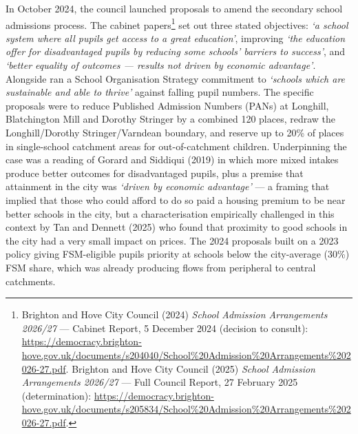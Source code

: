 \documentclass[
  12pt,
  titlepage]{article}
\begin{document}
In October 2024, the council launched proposals to amend the secondary
school admissions process. The cabinet papers\footnote{Brighton and Hove
  City Council (2024) \emph{School Admission Arrangements 2026/27} ---
  Cabinet Report, 5 December 2024 (decision to consult):
  \url{https://democracy.brighton-hove.gov.uk/documents/s204040/School\%20Admission\%20Arrangements\%202026-27.pdf}.
  Brighton and Hove City Council (2025) \emph{School Admission
  Arrangements 2026/27} --- Full Council Report, 27 February 2025
  (determination):
  \url{https://democracy.brighton-hove.gov.uk/documents/s205834/School\%20Admission\%20Arrangements\%202026-27.pdf}.}
set out three stated objectives: \emph{`a school system where all pupils
get access to a great education'}, improving \emph{`the education offer
for disadvantaged pupils by reducing some schools' barriers to
success'}, and \emph{`better equality of outcomes --- results not driven
by economic advantage'}. Alongside ran a School Organisation Strategy
commitment to \emph{`schools which are sustainable and able to thrive'}
against falling pupil numbers. The specific proposals were to reduce
Published Admission Numbers (PANs) at Longhill, Blatchington Mill and
Dorothy Stringer by a combined 120 places, redraw the Longhill/Dorothy
Stringer/Varndean boundary, and reserve up to 20\% of places in
single-school catchment areas for out-of-catchment children.
Underpinning the case was a reading of Gorard and Siddiqui (2019) in
which more mixed intakes produce better outcomes for disadvantaged
pupils, plus a premise that attainment in the city was \emph{`driven by
economic advantage'} --- a framing that implied that those who could
afford to do so paid a housing premium to be near better schools in the
city, but a characterisation empirically challenged in this context by
Tan and Dennett (2025) who found that proximity to good schools in the
city had a very small impact on prices. The 2024 proposals built on a
2023 policy giving FSM-eligible pupils priority at schools below the
city-average (30\%) FSM share, which was already producing flows from
peripheral to central catchments.
\end{document}
